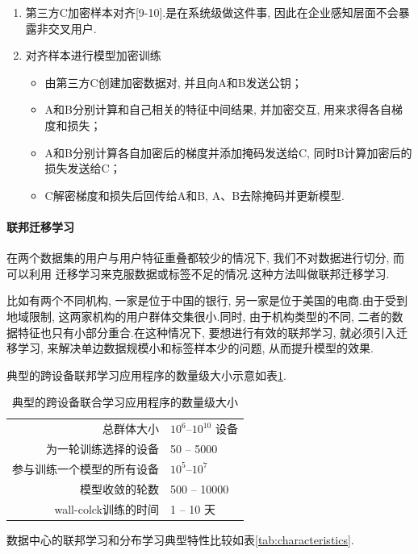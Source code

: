 \documentclass[a4paper]{article}
\begin{document}
\begin{enumerate}
    \item  第三方C加密样本对齐[9-10].是在系统级做这件事, 因此在企业感知层面不会暴露非交叉用户.
    \item 对齐样本进行模型加密训练
    \begin{itemize}
        \item 由第三方C创建加密数据对, 并且向A和B发送公钥；
        \item A和B分别计算和自己相关的特征中间结果, 并加密交互, 用来求得各自梯度和损失；
        \item A和B分别计算各自加密后的梯度并添加掩码发送给C, 同时B计算加密后的损失发送给C；
        \item C解密梯度和损失后回传给A和B, A、B去除掩码并更新模型.
    \end{itemize}
\end{enumerate}
\paragraph{联邦迁移学习}
在两个数据集的用户与用户特征重叠都较少的情况下, 我们不对数据进行切分, 而可以利用 迁移学习\citep{pan2009survey}来克服数据或标签不足的情况.这种方法叫做联邦迁移学习.

比如有两个不同机构, 一家是位于中国的银行, 另一家是位于美国的电商.由于受到地域限制, 这两家机构的用户群体交集很小.同时, 由于机构类型的不同, 二者的数据特征也只有小部分重合.在这种情况下, 要想进行有效的联邦学习, 就必须引入迁移学习, 来解决单边数据规模小和标签样本少的问题, 从而提升模型的效果.

典型的跨设备联邦学习应用程序的数量级大小示意如表\ref{tab:sizes}.
 
\begin{table}
    \centering
    \renewcommand{\arraystretch}{1.2}
    \begin{tabular}{rl}    
    \toprule
    总群体大小 &  $10^6$--$10^{10}$ 设备\\
    为一轮训练选择的设备 & 50 -- 5000 \\
    参与训练一个模型的所有设备 & $10^5$--$10^7$  \\
    模型收敛的轮数 & 500 -- 10000 \\
    wall-colck训练的时间 & 1 -- 10 天 \\ 
    \bottomrule 
    \end{tabular}
    \caption{典型的跨设备联合学习应用程序的数量级大小}
    \label{tab:sizes}
\end{table}


数据中心的联邦学习和分布学习典型特性比较如表\ref{tab:characteristics}.
%
 
\end{document}
